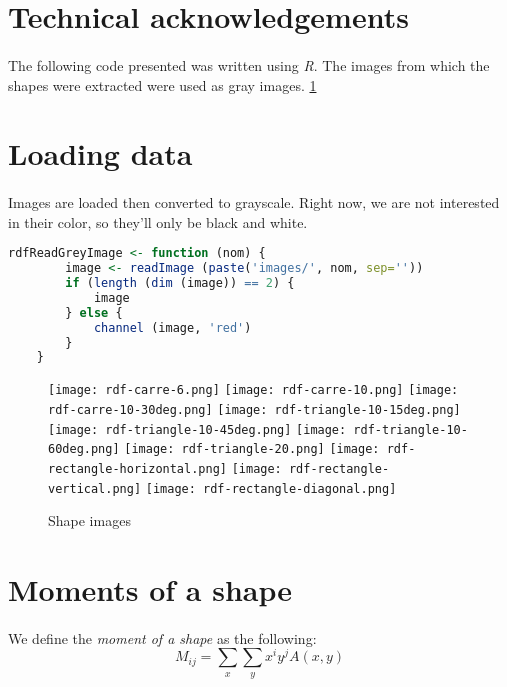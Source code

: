 \section{Technical acknowledgements}
\paragraph{}
The following code presented was written using \emph{R}. The images from which the shapes were extracted were used as gray images. \ref{fig:gray-images}

\section{Loading data}
\paragraph{}
Images are loaded then converted to grayscale. Right now, we are not interested in their color, so they'll only be black and white.

\begin{lstlisting}[language=R, caption=Loading images in R]
    rdfReadGreyImage <- function (nom) {
        image <- readImage (paste('images/', nom, sep=''))
        if (length (dim (image)) == 2) {
            image
        } else {
            channel (image, 'red')
        }
    }
\end{lstlisting}

\begin{figure}[h]
    \centering
    \texttt{[image: rdf-carre-6.png]}
    \texttt{[image: rdf-carre-10.png]}
    \texttt{[image: rdf-carre-10-30deg.png]}
    \texttt{[image: rdf-triangle-10-15deg.png]}
    \texttt{[image: rdf-triangle-10-45deg.png]}
    \texttt{[image: rdf-triangle-10-60deg.png]}
    \texttt{[image: rdf-triangle-20.png]}
    \texttt{[image: rdf-rectangle-horizontal.png]}
    \texttt{[image: rdf-rectangle-vertical.png]}
    \texttt{[image: rdf-rectangle-diagonal.png]}
    \caption{Shape images}
    \label{fig:gray-images}
\end{figure}

\clearpage

\section{Moments of a shape}
\paragraph{}
We define the \emph{moment of a shape} as the following:
$$M_{ij} = \sum_{x}\sum_{y} x^{i} y^{j} A(x, y)$$
